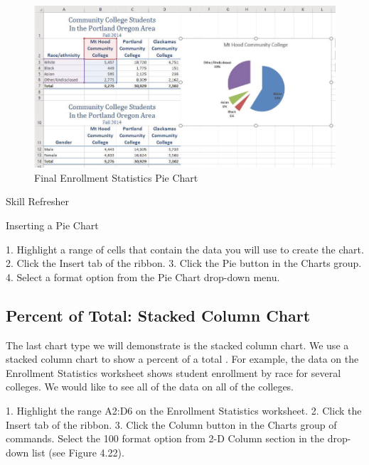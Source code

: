 \begin{figure}[H]
	\centering
	\includegraphics[width=\maxwidth{.95\linewidth}]{gfx/ch04_fig24}
	\caption{Final Enrollment Statistics Pie Chart}
	\label{04:fig24}
\end{figure}







Skill Refresher


Inserting a Pie Chart

1. Highlight a range of cells that contain the data you will use to create the chart.
2. Click the Insert tab of the ribbon.
3. Click the Pie button in the Charts group.
4. Select a format option from the Pie Chart drop-down menu.



\subsection{Percent of Total: Stacked Column Chart}

The last chart type we will demonstrate is the stacked column chart. We use a stacked column chart to
show a percent of a total . For example, the data on the Enrollment Statistics worksheet shows student
enrollment by race for several colleges. We would like to see all of the data on all of the colleges.

1. Highlight the range A2:D6 on the Enrollment Statistics worksheet.
2. Click the Insert tab of the ribbon.
3. Click the Column button in the Charts group of commands. Select the 100%
format option from 2-D Column section in the drop-down list (see Figure 4.22).



